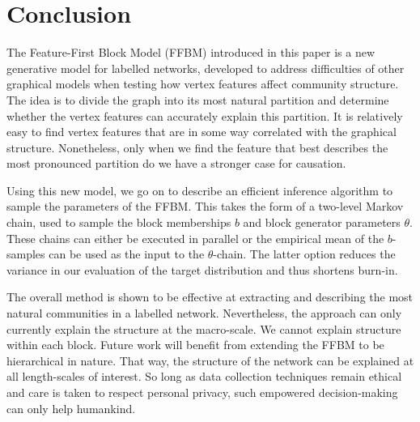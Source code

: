 \section{Conclusion}
\label{sec:conclusion}

The Feature-First Block Model (FFBM) introduced 
in this paper is a new generative model for labelled networks,
developed to address difficulties of other graphical models 
when testing how vertex features affect community structure. The idea 
is to divide the graph into its most natural partition and determine whether 
the vertex features can accurately explain this partition. 
It is relatively easy to find vertex features that are in some way 
correlated with the graphical structure. Nonetheless, only when 
we find the feature that best describes the most pronounced partition 
do we have a stronger case for causation.

Using this new model,
we go on to describe an efficient inference algorithm to sample 
the parameters of the FFBM. 
This takes the form of a two-level Markov chain,
used to sample the block memberships $b$ and block generator 
parameters $\theta$. These chains can either be executed
in parallel or 
the empirical mean of the $b$-samples can be used
as the input to the $\theta$-chain. The latter option
reduces the variance in our evaluation of the target distribution 
and thus shortens burn-in.

The overall method is shown to be effective at extracting and describing 
the most natural communities in a labelled network. Nevertheless, the approach 
can only currently explain the structure at the macro-scale. We cannot 
explain structure within each block. Future work will benefit from extending 
the FFBM to be hierarchical in nature. That way, the structure of the network 
can be explained at all length-scales of interest. So long as data 
collection techniques remain ethical and care is taken to respect 
personal privacy, such empowered decision-making can only help humankind.


